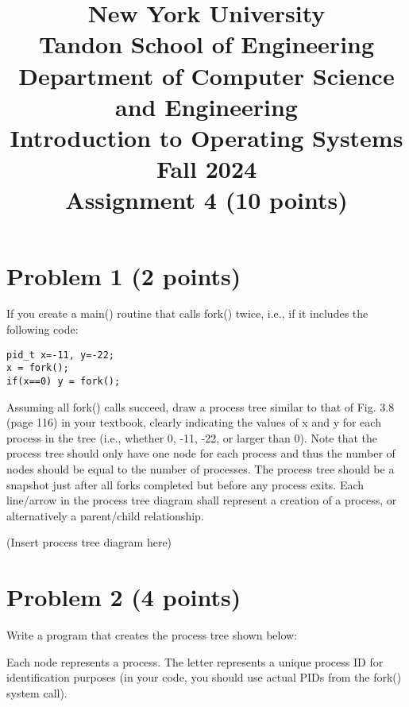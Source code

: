\documentclass{article}
\begin{document}
\title{New York University\\Tandon School of Engineering\\Department of Computer Science and Engineering\\Introduction to Operating Systems\\Fall 2024\\Assignment 4 (10 points)}
\date{}
\maketitle

\section*{Problem 1 (2 points)}

If you create a main() routine that calls fork() twice, i.e., if it includes the following code:

\begin{verbatim}
pid_t x=-11, y=-22;
x = fork();
if(x==0) y = fork();
\end{verbatim}

Assuming all fork() calls succeed, draw a process tree similar to that of Fig. 3.8 (page 116) in your textbook, clearly indicating the values of x and y for each process in the tree (i.e., whether 0, -11, -22, or larger than 0). Note that the process tree should only have one node for each process and thus the number of nodes should be equal to the number of processes. The process tree should be a snapshot just after all forks completed but before any process exits. Each line/arrow in the process tree diagram shall represent a creation of a process, or alternatively a parent/child relationship.

(Insert process tree diagram here)


\section*{Problem 2 (4 points)}

Write a program that creates the process tree shown below:

\begin{center}
\end{center}
Each node represents a process.  The letter represents a unique process ID for identification purposes (in your code, you should use actual PIDs from the fork() system call).
\end{document}
